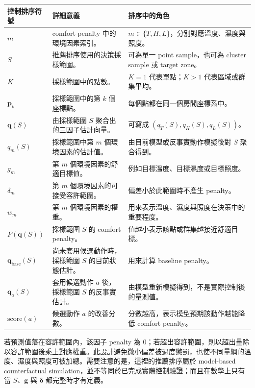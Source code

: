 \documentclass[12pt,a4paper]{article}
\begin{document}
\begin{table}[htbp]
\centering
\footnotesize
\renewcommand{\arraystretch}{1.25}
\begin{tabular}{|>{\raggedright\arraybackslash}p{}|>{\raggedright\arraybackslash}p{}|>{\raggedright\arraybackslash}p{}|}
\hline
\textbf{控制排序符號} & \textbf{詳細意義} & \textbf{排序中的角色} \\
\hline
$m$ & comfort penalty 中的環境因素索引。 & $m\in\{T,H,L\}$，分別對應溫度、濕度與照度。 \\
\hline
$S$ & 推薦排序使用的決策採樣範圍。 & 可為單一 point sample，也可為 cluster sample 或 target zone。 \\
\hline
$K$ & 採樣範圍中的點數。 & $K=1$ 代表單點；$K>1$ 代表區域或群集平均。 \\
\hline
$\mathbf{p}_k$ & 採樣範圍中的第 $k$ 個座標點。 & 每個點都在同一個房間座標系中。 \\
\hline
$\mathbf{q}(S)$ & 由採樣範圍 $S$ 聚合出的三因子估計向量。 & 可寫成 $(q_T(S),q_H(S),q_L(S))$。 \\
\hline
$q_m(S)$ & 採樣範圍中第 $m$ 個環境因素的估計值。 & 由目前模型或反事實動作模擬後對 $S$ 聚合得到。 \\
\hline
$g_m$ & 第 $m$ 個環境因素的舒適目標值。 & 例如目標溫度、目標濕度或目標照度。 \\
\hline
$\delta_m$ & 第 $m$ 個環境因素的可接受容許範圍。 & 偏差小於此範圍時不產生 penalty。 \\
\hline
$w_m$ & 第 $m$ 個環境因素的權重。 & 用來表示溫度、濕度與照度在決策中的重要程度。 \\
\hline
$P(\mathbf{q}(S))$ & 採樣範圍 $S$ 的 comfort penalty。 & 值越小表示該點或群集越接近舒適目標。 \\
\hline
$\mathbf{q}_{\mathrm{base}}(S)$ & 尚未套用候選動作時，採樣範圍 $S$ 的目前狀態估計。 & 用來計算 baseline penalty。 \\
\hline
$\mathbf{q}_a(S)$ & 套用候選動作 $a$ 後，採樣範圍 $S$ 的反事實估計。 & 由模型重新模擬得到，不是實際控制後的量測值。 \\
\hline
$\mathrm{score}(a)$ & 候選動作 $a$ 的改善分數。 & 分數越高，表示模型預期該動作越能降低 comfort penalty。 \\
\hline
\end{tabular}
\end{table}

若預測值落在容許範圍內，該因子 penalty 為 0；若超出容許範圍，則以超出量除以容許範圍後乘上對應權重。此設計避免微小偏差被過度懲罰，也使不同量綱的溫度、濕度與照度可被加總。需要注意的是，這裡的推薦排序屬於 model-based counterfactual simulation，並不等同於已完成實際控制驗證；而且在數學上只有當 $S$、$\mathbf{g}$ 與 $\boldsymbol{\delta}$ 都完整時才有定義。
\end{document}
